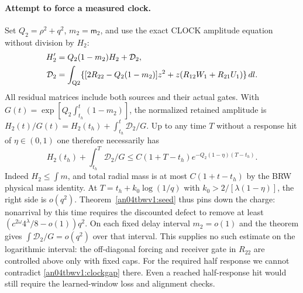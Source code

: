 \documentclass[11pt]{article}
\begin{document}
\paragraph{Attempt to force a measured clock.}
Set $Q_2=\rho^2+q^2$, $m_2=\mathsf m_2$, and use the exact
CLOCK amplitude equation without division by $H_2$:
\begin{align*}
 H_2'&=Q_2(1-m_2)H_2+\mathcal D_2,\\
 \mathcal D_2&=\int_{\rm Q2}
 \{[2R_{22}-Q_2(1-m_2)]z^2+z(R_{12}W_1+R_{21}U_1)\}\,dl .
\end{align*}
All residual matrices include both sources and their actual gates.
With $G(t)=\exp[Q_2\int_{t_h}^t(1-m_2)]$, the normalized
retained amplitude is $H_2(t)/G(t)=H_2(t_h)+\int_{t_h}^t
\mathcal D_2/G$. Up to any time $T$ without a response hit
of $\eta\in(0,1)$ one therefore necessarily has
\begin{equation}\label{an04tbwv1:clockgap}
 H_2(t_h)+\int_{t_h}^T\mathcal D_2/G
 \le C(1+T-t_h)e^{-Q_2(1-\eta)(T-t_h)} .
\end{equation}
Indeed $H_2\le\int m$, and total radial mass is at most
$C(1+t-t_h)$ by the BRW physical mass identity.
At $T=t_h+k_0\log(1/q)$ with $k_0>2/[\lambda(1-\eta)]$,
the right side is $o(q^2)$. Theorem~\ref{an04tbwv1:seed} thus
pins down the charge: nonarrival by this time requires the
discounted defect to remove at least
$(c^{2\omega}4^\lambda/8-o(1))q^2$.
On each fixed delay interval $m_2=o(1)$ and the theorem gives
$\int\mathcal D_2/G=o(q^2)$ over that interval. This supplies no
such estimate on the logarithmic interval: the off-diagonal forcing
and receiver gate in $R_{22}$ are controlled above only with fixed
caps. For the required half response we cannot contradict
\eqref{an04tbwv1:clockgap} there. Even
a reached half-response hit would still require the learned-window
loss and alignment checks.
\end{document}
